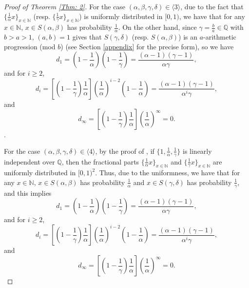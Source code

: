 \documentclass{amsart}
\theoremstyle{definition}
\numberwithin{equation}{section}%
\begin{document}
\begin{proof}[Proof of Theorem \ref{Thm: 2}]
For the case $(\alpha,\beta, \gamma, \delta)\in \langle 3\rangle$, due to the fact that $\{\frac{1}{\alpha} x\}_{x\in \mathbb{N}}$ (resp. $\{\frac{1}{\gamma} x\}_{x\in \mathbb{N}}$) is uniformly distributed in $[0,1)$, we have that for any $x\in \mathbb{N}$, $x\in S(\alpha, \beta)$ has probability $\frac{1}{\alpha}$. On the other hand, since $\gamma=\frac{b}{a}\in \mathbb{Q}$ with $b>a>1$, $(a,b)=1$ gives that $S(\gamma, \delta)$ (resp. $S(\alpha, \beta)$) is an $a$-arithmetic progression (mod $b$) (see Section \ref{appendix} for the precise form), so we have 
\begin{equation*}
    d_1=\left(1-\frac{1}{\alpha}\right)\left(1-\frac{1}{\gamma}\right)=\frac{(\alpha-1)(\gamma-1)}{\alpha \gamma},
\end{equation*}
and for $i\geq 2$,
\begin{equation*}
   d_i=\left[\left(1-\frac{1}{\gamma}\right)\frac{1}{\alpha}\right]\left(\frac{1}{\alpha}\right)^{i-2} \left(1-\frac{1}{\alpha}\right)= \frac{\left( \alpha -1\right) \left( \gamma -1\right) }{\alpha ^{i}\gamma },
\end{equation*}
and 
\begin{equation*}
   d_\infty=\left[\left(1-\frac{1}{\gamma}\right)\frac{1}{\alpha}\right]\left(\frac{1}{\alpha}\right)^{\infty}=0.
\end{equation*}.


For the case $(\alpha,\beta, \gamma, \delta)\in \langle 4\rangle$, by the proof of \cite[Theorem 1]{harman2015primes}, if $\{1, \frac{1}{\alpha}, \frac{1}{\gamma}\}$ is linearly independent over $\mathbb{Q}$, then the fractional parts $\{\frac{1}{\alpha}x\}_{x\in\mathbb{N}}$ and $\{\frac{1}{\gamma}x\}_{x\in\mathbb{N}}$ are uniformly distributed in $[0,1)^2$. Thus, due to the uniformness, we have that for any $x\in \mathbb{N}$, $x\in S(\alpha, \beta)$ has probability $\frac{1}{\alpha}$ and $x\in S(\gamma, \delta)$ has probability $\frac{1}{\gamma}$, and this implies 
\begin{equation*}
    d_1=\left(1-\frac{1}{\alpha}\right)\left(1-\frac{1}{\gamma}\right)=\frac{(\alpha-1)(\gamma-1)}{\alpha \gamma},
\end{equation*}
and for $i\geq 2$,
\begin{equation*}
   d_i=\left[\left(1-\frac{1}{\gamma}\right)\frac{1}{\alpha}\right]\left(\frac{1}{\alpha}\right)^{i-2} \left(1-\frac{1}{\alpha}\right)= \frac{\left( \alpha -1\right) \left( \gamma -1\right) }{\alpha ^{i}\gamma },
\end{equation*}
and 
\begin{equation*}
   d_\infty=\left[\left(1-\frac{1}{\gamma}\right)\frac{1}{\alpha}\right]\left(\frac{1}{\alpha}\right)^{\infty}=0.
\end{equation*}





\end{proof}
\end{document}
